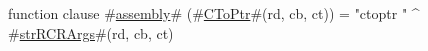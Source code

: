 function clause #\hyperref[sailMIPSzassembly]{assembly}# (#\hyperref[sailMIPSzCToPtr]{CToPtr}#(rd, cb, ct)) = "ctoptr " ^ #\hyperref[sailMIPSzstrRCRArgs]{strRCRArgs}#(rd, cb, ct)
